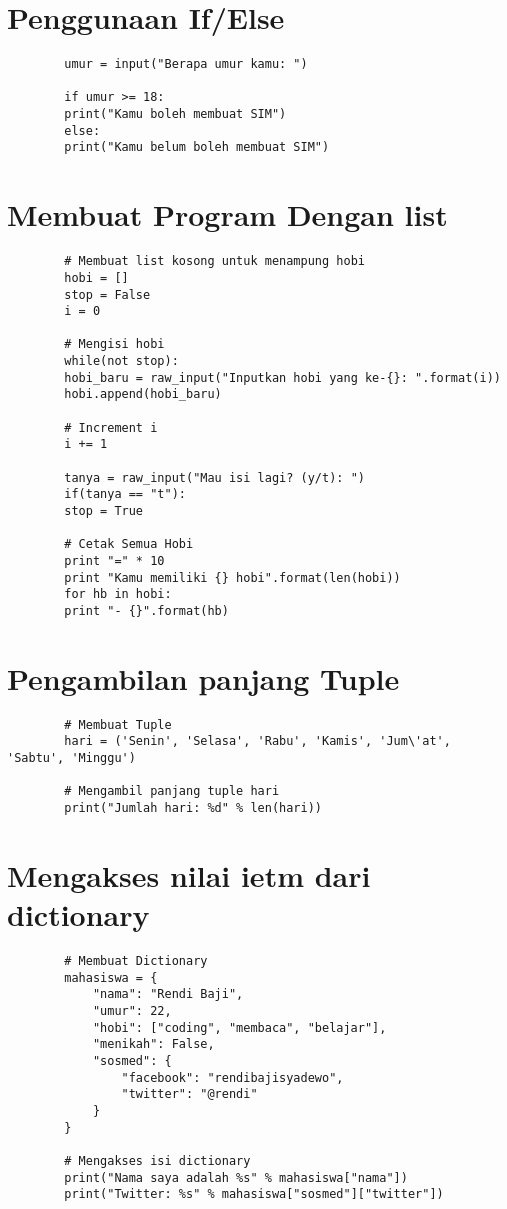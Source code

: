 \documentclass{article}
\begin{document}
	\section{Penggunaan If/Else}
	\begin{lstlisting}
		umur = input("Berapa umur kamu: ")
		
		if umur >= 18:
		print("Kamu boleh membuat SIM")
		else:
		print("Kamu belum boleh membuat SIM")
	\end{lstlisting}
	
	\section{Membuat Program Dengan list}
	\begin{lstlisting}
		# Membuat list kosong untuk menampung hobi
		hobi = []
		stop = False
		i = 0
		
		# Mengisi hobi
		while(not stop):
		hobi_baru = raw_input("Inputkan hobi yang ke-{}: ".format(i))
		hobi.append(hobi_baru)
		
		# Increment i
		i += 1
		
		tanya = raw_input("Mau isi lagi? (y/t): ")
		if(tanya == "t"): 
		stop = True
		
		# Cetak Semua Hobi
		print "=" * 10 
		print "Kamu memiliki {} hobi".format(len(hobi))
		for hb in hobi:
		print "- {}".format(hb)
	\end{lstlisting}
	
	\section{Pengambilan panjang Tuple}
	\begin{lstlisting}
		# Membuat Tuple
		hari = ('Senin', 'Selasa', 'Rabu', 'Kamis', 'Jum\'at', 'Sabtu', 'Minggu')
		
		# Mengambil panjang tuple hari
		print("Jumlah hari: %d" % len(hari))
	\end{lstlisting}
	
	\section{Mengakses nilai ietm dari dictionary}
	\begin{lstlisting}
		# Membuat Dictionary
		mahasiswa = {
			"nama": "Rendi Baji",
			"umur": 22,
			"hobi": ["coding", "membaca", "belajar"],
			"menikah": False,
			"sosmed": {
				"facebook": "rendibajisyadewo",
				"twitter": "@rendi"
			} 
		}
		
		# Mengakses isi dictionary
		print("Nama saya adalah %s" % mahasiswa["nama"])
		print("Twitter: %s" % mahasiswa["sosmed"]["twitter"])
	\end{lstlisting}
	
\end{document}
